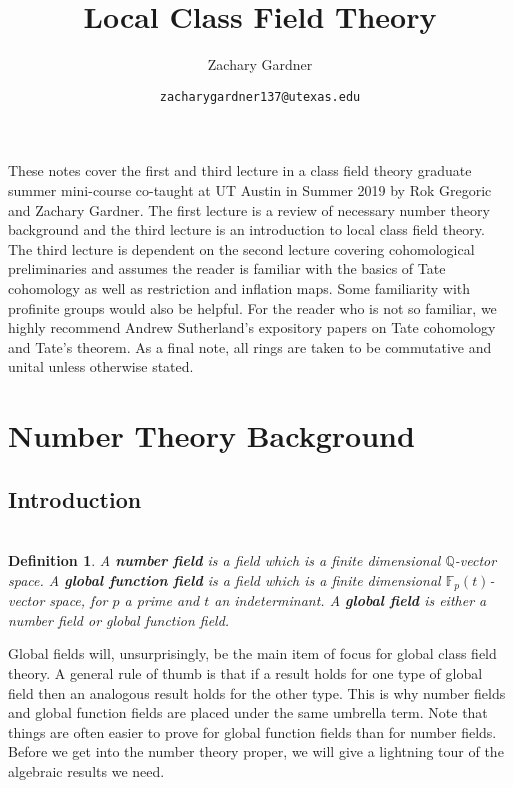 \documentclass[11pt]{article}
\newcommand{\F}{\mathbb{F}}
\newcommand{\Q}{\mathbb{Q}}
\newtheorem*{definition*}{\\Definition}
\begin{document}
\title{Local Class Field Theory}
\author{Zachary Gardner}
\date{\texttt{zacharygardner137@utexas.edu}}
\maketitle

These notes cover the first and third lecture in a class field theory graduate summer mini-course co-taught at UT Austin in Summer 2019 by Rok Gregoric and Zachary Gardner. The first lecture is a review of necessary number theory background and the third lecture is an introduction to local class field theory. The third lecture is dependent on the second lecture covering cohomological preliminaries and assumes the reader is familiar with the basics of Tate cohomology as well as restriction and inflation maps. Some familiarity with profinite groups would also be helpful. For the reader who is not so familiar, we highly recommend Andrew Sutherland's expository papers on Tate cohomology and Tate's theorem. As a final note, all rings are taken to be commutative and unital unless otherwise stated. 

\tableofcontents
\newpage

\section{Number Theory Background}
\subsection{Introduction}
\begin{definition*}
A \textbf{number field} is a field which is a finite dimensional $\Q$-vector space. A \textbf{global function field} is a field which is a finite dimensional $\F_p(t)$-vector space, for $p$ a prime and $t$ an indeterminant. A \textbf{global field} is either a number field or global function field.
\end{definition*}

Global fields will, unsurprisingly, be the main item of focus for global class field theory. A general rule of thumb is that if a result holds for one type of global field then an analogous result holds for the other type. This is why number fields and global function fields are placed under the same umbrella term. Note that things are often easier to prove for global function fields than for number fields. Before we get into the number theory proper, we will give a lightning tour of the algebraic results we need.
\end{document}
